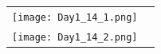 \documentclass[11pt]{article}
\begin{document}
\newpage
\begin{center}
\begin{table}[htdp]
\begin{center}
\begin{tabular}{cc}
\texttt{[image: Day1\_14\_1.png]}\\
\texttt{[image: Day1\_14\_2.png]}\\
\end{tabular}
\end{center}
\end{table}%
\end{center}



\newpage
\begin{center}
\end{center}
\end{document}
